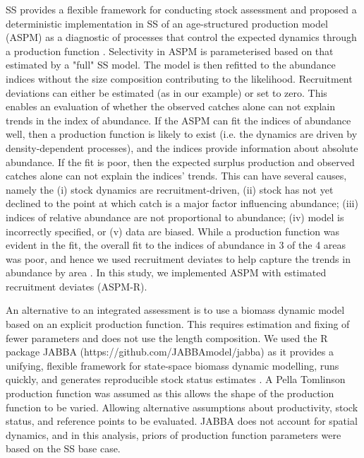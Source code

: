 \documentclass[11pt,a4paper]{article}
\begin{document}
{SS provides a flexible framework for conducting stock assessment and 
\cite{maunder2015contemporary} proposed a deterministic implementation in SS of an age-structured production model (ASPM) as a diagnostic of processes that control the expected dynamics through a production function \citep{carvalho2017can}. Selectivity in ASPM is parameterised based on that estimated by a "full" SS model. The model is then refitted to the abundance indices without the size composition contributing to the likelihood. Recruitment deviations can either be estimated (as in our example) or set to zero. This enables an evaluation of whether the observed catches alone can not explain trends in the index of abundance. If the ASPM can fit the indices of abundance well, then a production function is likely to exist (i.e. the dynamics are driven by density-dependent processes), and the indices provide information about absolute abundance. If the fit is poor, then the expected surplus production and observed catches alone can not explain the indices' trends. This can have several causes, namely the (i) stock dynamics are recruitment-driven, (ii) stock has not yet declined to the point at which catch is a major factor influencing abundance; (iii) indices of relative abundance are not proportional to abundance;  (iv) model is incorrectly specified, or (v) data are biased. While a production function was evident in the fit, the overall fit to the indices of abundance in 3 of the 4 areas was poor, and hence we used recruitment deviates to help capture the trends in abundance by area \cite[see][]{minte2017get}. In this study, we implemented ASPM with estimated recruitment deviates (ASPM-R). 

An alternative to an integrated assessment is to use a biomass dynamic model based on an explicit production function. This requires estimation and fixing of fewer parameters and does not use the length composition. We used the R package JABBA (https://github.com/JABBAmodel/jabba) as it provides a unifying, flexible framework for state-space biomass dynamic modelling, runs quickly, and generates reproducible stock status estimates \citep{winker2018jabba}. 
A Pella Tomlinson production function \citep{pella1969generalized} 
was assumed as this allows the shape of the production function to be varied. Allowing alternative assumptions about productivity, stock status, and reference points to be evaluated. JABBA does not account for spatial dynamics, and in this analysis, priors of production function parameters were based on the SS base case. 

}
\end{document}
